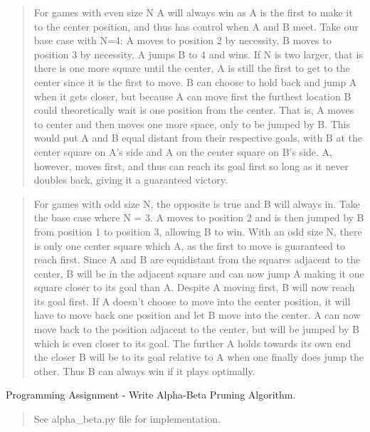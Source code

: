 \documentclass[11pt]{article}
\newenvironment{problem}[2][Problem]{\begin{trivlist}
\item[\hskip \labelsep {\bfseries #1}\hskip \labelsep {\bfseries #2.}]}{\end{trivlist}}
\begin{document}
\begin{problem}{6}
\begin{enumerate}
\begin{verse}
		For games with even size N A will always win as A is the first to make it to the center position, and thus has control when A and B meet. Take our base case with N=4: A moves to position 2 by necessity, B moves to position 3 by necessity, A jumps B to 4 and wins. If N is two larger, that is there is one more square until the center, A is still the first to get to the center since it is the first to move. B can choose to hold back and jump A when it gets closer, but because A can move first the furthest location B could theoretically wait is one position from the center. That is, A moves to center and then moves one more space, only to be jumped by B. This would put A and B equal distant from their respective goals, with B at the center square on A's side and A on the center square on B's side. A, however, moves first, and thus can reach its goal first so long as it never doubles back, giving it a guaranteed victory.
	\end{verse}
	\begin{verse}
		For games with odd size N, the opposite is true and B will always in. Take the base case where N = 3. A moves to position 2 and is then jumped by B from position 1 to position 3, allowing B to win. With an odd size N, there is only one center square which A, as the first to move is guaranteed to reach first. Since A and B are equidistant from the squares adjacent to the center, B will be in the adjacent square and can now jump A making it one square closer to its goal than A. Despite A moving first, B will now reach its goal first. If A doesn't choose to move into the center position, it will have to move back one position and let B move into the center. A can now move back to the position adjacent to the center, but will be jumped by B which is even closer to its goal. The further A holds towards its own end the closer B will be to its goal relative to A when one finally does jump the other. Thus B can always win if it plays optimally.
	\end{verse}
\end{enumerate}
\end{problem}
\begin{problem}{7}
	Programming Assignment - Write Alpha-Beta Pruning Algorithm.
	\begin{verse}
		See alpha\_beta.py file for implementation.
	\end{verse}
\end{problem}
\end{document}
